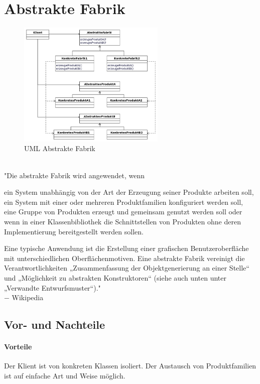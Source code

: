 \documentclass{school}
\begin{document}
\section{Abstrakte Fabrik}
\begin{figure}[h]
	\centering
	\includegraphics[height=6cm]{abstractfactory.png}
	\caption{UML Abstrakte Fabrik \cite{wiki-abstraktefabrik-uml}}
\end{figure}
~\\
"Die abstrakte Fabrik wird angewendet, wenn
\begin{outline}
\1 ein System unabhängig von der Art der Erzeugung seiner Produkte arbeiten soll,
\1 ein System mit einer oder mehreren Produktfamilien konfiguriert werden soll,
\1 eine Gruppe von Produkten erzeugt und gemeinsam genutzt werden soll oder
\1 wenn in einer Klassenbibliothek die Schnittstellen von Produkten ohne deren Implementierung bereitgestellt werden sollen.
\end{outline}
Eine typische Anwendung ist die Erstellung einer grafischen Benutzeroberfläche mit unterschiedlichen Oberflächenmotiven. Eine abstrakte Fabrik vereinigt die Verantwortlichkeiten „Zusammenfassung der Objektgenerierung an einer Stelle“ und „Möglichkeit zu abstrakten Konstruktoren“ (siehe auch unten unter „Verwandte Entwurfsmuster“)."\\
$-$ Wikipedia \cite{wiki-abstraktefabrik}

\subsection{Vor- und Nachteile}
\paragraph{Vorteile}
\begin{outline}
\1 Der Klient ist von konkreten Klassen isoliert.
\1 Der Austausch von Produktfamilien ist auf einfache Art und Weise möglich.
\end{outline}
\end{document}
